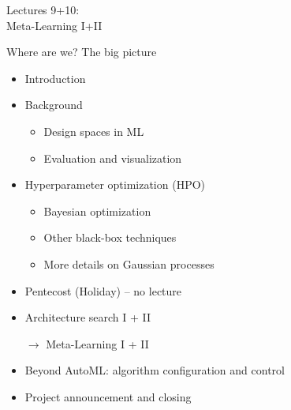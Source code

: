 \begin{frame}[c]{}

\centering
\huge
Lectures 9+10:\\
Meta-Learning I+II
\end{frame}
\begin{frame}[c]{Where are we? The big picture}

\begin{itemize}
	\item Introduction
	\item Background
	\begin{itemize}
		\item Design spaces in ML
		\item Evaluation and visualization
	\end{itemize}
	\item Hyperparameter optimization (HPO)
	\begin{itemize}
		\item Bayesian optimization
		\item Other black-box techniques
		\item More details on Gaussian processes
	\end{itemize}
	\item Pentecost (Holiday) -- no lecture
	\item Architecture search I + II
	\item[$\to$] Meta-Learning I + II
	\item Beyond AutoML: algorithm configuration and control
	\item Project announcement and closing
\end{itemize}

\end{frame}


